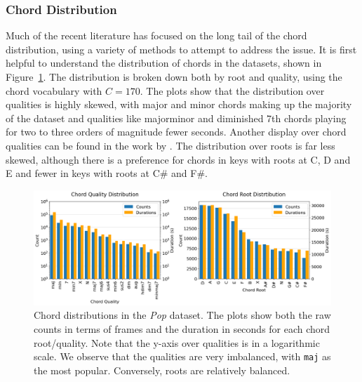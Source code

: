 \subsubsection{Chord Distribution}

Much of the recent literature has focused on the long tail of the chord distribution, using a variety of methods to attempt to address the issue. It is first helpful to understand the distribution of chords in the datasets, shown in Figure~\ref{fig:chord-distribution}. The distribution is broken down both by root and quality, using the chord vocabulary with $C=170$. The plots show that the distribution over qualities is highly skewed, with major and minor chords making up the majority of the dataset and qualities like majorminor and diminished 7th chords playing for two to three orders of magnitude fewer seconds. Another display over chord qualities can be found in the work by \citet{ACRLargeVocab1}. The distribution over roots is far less skewed, although there is a preference for chords in keys with roots at C, D and E and fewer in keys with roots at C\# and F\#.

\begin{figure}[H]
    \centering
    \includegraphics[width=1.0\textwidth]{figures/chord_distribution.png}
    \caption{Chord distributions in the \emph{Pop} dataset. The plots show both the raw counts in terms of frames and the duration in seconds for each chord root/quality. Note that the y-axis over qualities is in a logarithmic scale. We observe that the qualities are very imbalanced, with \texttt{maj} as the most popular. Conversely, roots are relatively balanced.}\label{fig:chord-distribution}
\end{figure}




